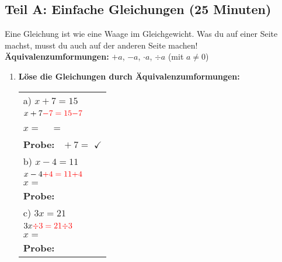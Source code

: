\subsection*{Teil A: Einfache Gleichungen (25 Minuten)}

\begin{merkbox}
    Eine Gleichung ist wie eine Waage im Gleichgewicht. Was du auf einer Seite machst, musst du auch auf der anderen Seite machen!\\
    \textbf{Äquivalenzumformungen:} $+a$, $-a$, $\cdot a$, $\div a$ (mit $a \neq 0$)
\end{merkbox}

\begin{enumerate}[label=\arabic*.]

    \item \textbf{Löse die Gleichungen durch Äquivalenzumformungen:}

    \vspace{0.5cm}

    \begin{tabular}{l}
        a) $x + 7 = 15$ \\[2ex]
        $x + 7 \color{red}{- 7} = 15 \color{red}{- 7}$ \\[1ex]
        $x = \phantom{00}$ = \underline{\hspace{2cm}} \\[3ex]
        \textbf{Probe:} $\phantom{0} + 7 = $ \underline{\hspace{2cm}} $\checkmark$ \\[4ex]

        b) $x - 4 = 11$ \\[2ex]
        $x - 4 \color{red}{+ 4} = 11 \color{red}{+ 4}$ \\[1ex]  
        $x = $ \underline{\hspace{2cm}} \\[3ex]
        \textbf{Probe:} \underline{\hspace{4cm}} \\[4ex]

        c) $3x = 21$ \\[2ex]
        $3x \color{red}{\div 3} = 21 \color{red}{\div 3}$ \\[1ex]
        $x = $ \underline{\hspace{2cm}} \\[3ex]
        \textbf{Probe:} \underline{\hspace{4cm}} \\[4ex]


\end{tabular}
\end{enumerate}
